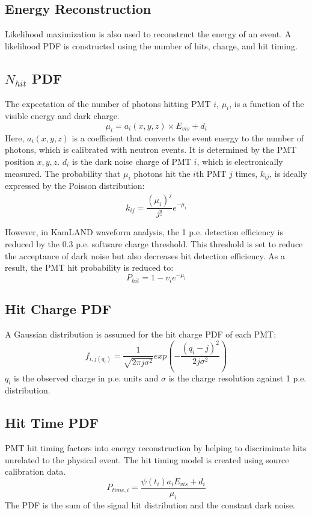 \subsection{Energy Reconstruction}
\label{sec:energy_reco}
Likelihood maximization is also used to reconstruct the energy of an event. A likelihood PDF is constructed using the number of hits, charge, and hit timing.
\subsection*{$N_{hit}$ PDF}
The expectation of the number of photons hitting PMT $i$, $\mu_i$, is a function of the visible energy and dark charge.
\begin{equation}
	\mu_i = a_i(x,y,z)\times E_{vis} +d_i
\end{equation}
Here, $a_i(x,y,z)$ is a coefficient that converts the event energy to the number of photons, which is calibrated with neutron events. It is determined by the PMT position $x,y,z$. $d_i$ is the dark noise charge of PMT $i$, which is electronically measured. The probability that $\mu_i$ photons hit the $i$th PMT $j$ times, $k_{ij}$, is ideally expressed by the Poisson distribution:
\begin{equation}
	k_{ij}=\frac{(\mu_i)^j}{j!}e^{-\mu_i}
\end{equation}

However, in KamLAND waveform analysis, the 1 p.e. detection efficiency is reduced by the 0.3 p.e. software charge threshold. This threshold is set to reduce the acceptance of dark noise but also decreases hit detection efficiency. As a result, the PMT hit probability is reduced to:
\begin{equation}
	P_{hit}=1-v_ie^{-\mu_i}
\end{equation}

\subsection*{Hit Charge PDF}
A Gaussian distribution is assumed for the hit charge PDF of each PMT:
\begin{equation}
	f_{i,j(q_i)}=\frac{1}{\sqrt{2\pi j\sigma^2}}exp(-\frac{(q_i-j)^2}{2j\sigma^2})
\end{equation}
$q_i$ is the observed charge in p.e. units and $\sigma$ is  the charge resolution against 1 p.e. distribution.

\subsection*{Hit Time PDF}
PMT hit timing factors into energy reconstruction by helping to discriminate hits unrelated to the physical event. The hit timing model is created using source calibration data. 
\begin{equation}
	P_{time,i} = \frac{\psi(t_i)a_i E_{vis}+d_i}{\mu_i}
\end{equation}
The PDF is the sum of the signal hit distribution and the constant dark noise.
